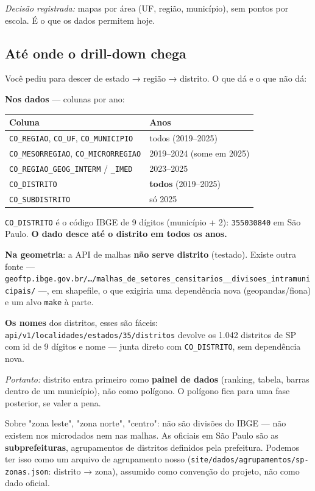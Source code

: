 \documentclass[11pt]{article}
\begin{document}
\emph{Decisão registrada:} mapas por área (UF, região, município), sem pontos por
escola. É o que os dados permitem hoje.
\subsection{Até onde o drill-down chega}
\label{sec:orgb6ccc80}

Você pediu para descer de estado → região → distrito. O que dá e o que não
dá:

\textbf{Nos dados} — colunas por ano:

\begin{center}
\begin{tabular}{ll}
Coluna & Anos\\
\hline
\texttt{CO\_REGIAO}, \texttt{CO\_UF}, \texttt{CO\_MUNICIPIO} & todos (2019–2025)\\
\texttt{CO\_MESORREGIAO}, \texttt{CO\_MICRORREGIAO} & 2019–2024 (some em 2025)\\
\texttt{CO\_REGIAO\_GEOG\_INTERM} / \texttt{\_IMED} & 2023–2025\\
\texttt{CO\_DISTRITO} & \textbf{todos} (2019–2025)\\
\texttt{CO\_SUBDISTRITO} & só 2025\\
\end{tabular}
\end{center}

\texttt{CO\_DISTRITO} é o código IBGE de 9 dígitos (município + 2): \texttt{355030840} em
São Paulo. \textbf{O dado desce até o distrito em todos os anos.}

\textbf{Na geometria}: a API de malhas \textbf{não serve distrito} (testado). Existe outra
fonte — \texttt{geoftp.ibge.gov.br/…/malhas\_de\_setores\_censitarios\_\_divisoes\_intramunicipais/}
—, em shapefile, o que exigiria uma dependência nova (geopandas/fiona) e um
alvo \texttt{make} à parte.

\textbf{Os nomes} dos distritos, esses são fáceis:
\texttt{api/v1/localidades/estados/35/distritos} devolve os 1.042 distritos de SP
com id de 9 dígitos e nome — junta direto com \texttt{CO\_DISTRITO}, sem
dependência nova.

\emph{Portanto:} distrito entra primeiro como \textbf{painel de dados} (ranking, tabela,
barras dentro de um município), não como polígono. O polígono fica para uma
fase posterior, se valer a pena.

Sobre "zona leste", "zona norte", "centro": não são divisões do IBGE — não
existem nos microdados nem nas malhas. As oficiais em São Paulo são as
\textbf{subprefeituras}, agrupamentos de distritos definidos pela prefeitura.
Podemos ter isso como um arquivo de agrupamento nosso
(\texttt{site/dados/agrupamentos/sp-zonas.json}: distrito → zona), assumido como
convenção do projeto, não como dado oficial.
\end{document}
